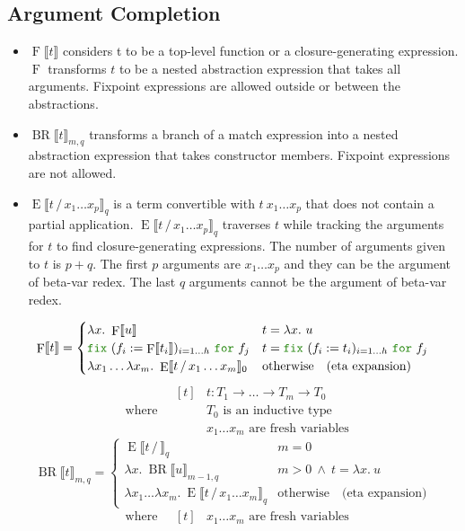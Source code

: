 \documentclass[a4paper,fleqn]{article}
\newcommand{\kwfix}{\mbox{\color{mygreen}\ttfamily fix}}
\newcommand{\kwfor}{\mbox{\color{mygreen}\ttfamily for}}
\newcommand{\lam}[2]{\lambda #1.~#2}
\newcommand{\lamB}[1]{\lambda #1.~}
\newcommand{\fix}[4]{\kwfix~(#1 := #2)_{#3}~\kwfor~#4}
\newcommand{\BRA}[1]{\llbracket #1 \rrbracket}
\DeclareMathOperator{\Fop}{F}
\newcommand{\F}[1]{\Fop\BRA{#1}}
\DeclareMathOperator{\BRop}{BR}
\newcommand{\BR}[3]{\BRop\BRA{#1}_{#2,#3}}
\DeclareMathOperator{\Eop}{E}
\newcommand{\E}[3]{\Eop\BRA{#1\,/\,#2}_{#3}}
\begin{document}
\subsection{Argument Completion}\label{sec:argcomp}
\raggedright
\begin{itemize}
  \item $\F{t}$ considers t to be a top-level function or a closure-generating expression.  $\Fop$ transforms $t$ to be a nested abstraction expression that takes all arguments.
    Fixpoint expressions are allowed outside or between the abstractions.
  \item $\BR{t}{m}{q}$ transforms a branch of a match expression into a nested abstraction expression that takes constructor members.
    Fixpoint expressions are not allowed.
  \item $\E{t}{x_1\dots x_p}{q}$ is a term convertible with $t~x_1\dots x_p$ that does not contain a partial application.
    $\E{t}{x_1\dots x_p}{q}$ traverses $t$ while tracking the arguments for $t$ to find closure-generating expressions.
    The number of arguments given to $t$ is $p+q$.
    The first $p$ arguments are $x_1\dots x_p$ and they can be the argument of beta-var redex.
    The last $q$ arguments cannot be the argument of beta-var redex.
\end{itemize}
\[
  \F{t} =
  \begin{cases}
    \lam{x}{\F{u}} & t = \lam{x}{u} \\
    \fix{f_i}{\F{t_i}}{i=1\dots h}{f_j}  & t = \fix{f_i}{t_i}{i=1\dots h}{f_j} \\
    \lambda x_1\dots\lamB{x_m}\E{t}{x_1\dots x_m}{0}        & \text{otherwise} \quad \text{(eta expansion)}
  \end{cases}
\]
\[ \quad\text{where} \quad
  \begin{aligned}[t]
    & t : T_1 \rightarrow \dots \rightarrow T_m \rightarrow T_0 \\
    & \text{$T_0$ is an inductive type} \\
    & \text{$x_1\dots x_m$ are fresh variables}
  \end{aligned}
\]
\[
  \BR{t}{m}{q} =
  \begin{cases}
    \E{t}{}{q}    & m = 0 \\
    \lam{x}{\BR{u}{m-1}{q}} & m > 0 ~\wedge~ t = \lam{x}{u} \\
    \lambda x_1\dots\lamB{x_m}\E{t}{x_1\dots x_m}{q}        & \text{otherwise} \quad \text{(eta expansion)}
  \end{cases}
\]
\[ \quad\text{where} \quad
  \begin{aligned}[t]
    & \text{$x_1\dots x_m$ are fresh variables}
  \end{aligned}
\]
\end{document}
